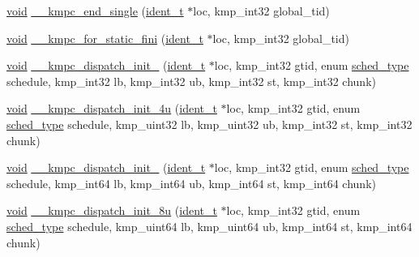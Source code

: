 \begin{DoxyCompactItemize}
\item 
\hyperlink{ittnotify__static_8h_af941d56e55e3c5465135b60c4d6343ed}{void} \hyperlink{group__WORK__SHARING_gaa7d615b194c12278b00841852b0dff2b}{\-\_\-\-\_\-kmpc\-\_\-end\-\_\-single} (\hyperlink{group__BASIC__TYPES_ga690fda6b92f039a72db263c6b4394ddb}{ident\-\_\-t} $\ast$loc, kmp\-\_\-int32 global\-\_\-tid)
\item 
\hyperlink{ittnotify__static_8h_af941d56e55e3c5465135b60c4d6343ed}{void} \hyperlink{group__WORK__SHARING_ga4bec24e63a011cc0bfca98e79f3c0b93}{\-\_\-\-\_\-kmpc\-\_\-for\-\_\-static\-\_\-fini} (\hyperlink{group__BASIC__TYPES_ga690fda6b92f039a72db263c6b4394ddb}{ident\-\_\-t} $\ast$loc, kmp\-\_\-int32 global\-\_\-tid)
\end{DoxyCompactItemize}
\begin{DoxyCompactItemize}
\item 
\hyperlink{ittnotify__static_8h_af941d56e55e3c5465135b60c4d6343ed}{void} \hyperlink{group__WORK__SHARING_gae991c61cbe8e2942fe1f757a65442b26}{\-\_\-\-\_\-kmpc\-\_\-dispatch\-\_\-init\-\_} (\hyperlink{group__BASIC__TYPES_ga690fda6b92f039a72db263c6b4394ddb}{ident\-\_\-t} $\ast$loc, kmp\-\_\-int32 gtid, enum \hyperlink{group__WORK__SHARING_gadcaf200537aaa0218a60c398438f81be}{sched\-\_\-type} schedule, kmp\-\_\-int32 lb, kmp\-\_\-int32 ub, kmp\-\_\-int32 st, kmp\-\_\-int32 chunk)
\item 
\hyperlink{ittnotify__static_8h_af941d56e55e3c5465135b60c4d6343ed}{void} \hyperlink{group__WORK__SHARING_gaed75fbf8e655bc644d585a48e810bcfc}{\-\_\-\-\_\-kmpc\-\_\-dispatch\-\_\-init\-\_\-4u} (\hyperlink{group__BASIC__TYPES_ga690fda6b92f039a72db263c6b4394ddb}{ident\-\_\-t} $\ast$loc, kmp\-\_\-int32 gtid, enum \hyperlink{group__WORK__SHARING_gadcaf200537aaa0218a60c398438f81be}{sched\-\_\-type} schedule, kmp\-\_\-uint32 lb, kmp\-\_\-uint32 ub, kmp\-\_\-int32 st, kmp\-\_\-int32 chunk)
\item 
\hyperlink{ittnotify__static_8h_af941d56e55e3c5465135b60c4d6343ed}{void} \hyperlink{group__WORK__SHARING_gafb31932f7af41b5db5e7d80b21926853}{\-\_\-\-\_\-kmpc\-\_\-dispatch\-\_\-init\-\_} (\hyperlink{group__BASIC__TYPES_ga690fda6b92f039a72db263c6b4394ddb}{ident\-\_\-t} $\ast$loc, kmp\-\_\-int32 gtid, enum \hyperlink{group__WORK__SHARING_gadcaf200537aaa0218a60c398438f81be}{sched\-\_\-type} schedule, kmp\-\_\-int64 lb, kmp\-\_\-int64 ub, kmp\-\_\-int64 st, kmp\-\_\-int64 chunk)
\item 
\hyperlink{ittnotify__static_8h_af941d56e55e3c5465135b60c4d6343ed}{void} \hyperlink{group__WORK__SHARING_gaf047657f8ff072f15174f03ff80b4882}{\-\_\-\-\_\-kmpc\-\_\-dispatch\-\_\-init\-\_\-8u} (\hyperlink{group__BASIC__TYPES_ga690fda6b92f039a72db263c6b4394ddb}{ident\-\_\-t} $\ast$loc, kmp\-\_\-int32 gtid, enum \hyperlink{group__WORK__SHARING_gadcaf200537aaa0218a60c398438f81be}{sched\-\_\-type} schedule, kmp\-\_\-uint64 lb, kmp\-\_\-uint64 ub, kmp\-\_\-int64 st, kmp\-\_\-int64 chunk)

\end{DoxyCompactItemize}
